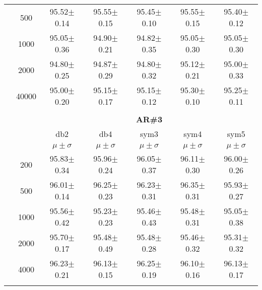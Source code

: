 \begin{table}[H]
\begin{tabular}{|c|c|c c c c c|}
&500  & 95.52$\pm$0.14	& 95.55$\pm$0.15	& 95.45$\pm$0.10	& 95.55$\pm$0.15	&95.40$\pm$0.12 \\\cline{2-7}
           
&1000 &95.05$\pm$0.36	&94.90$\pm$0.21	&94.82$\pm$0.35	&95.05$\pm$0.30	&95.05$\pm$0.30 \\\cline{2-7}
           
&2000 &94.80$\pm$0.25&94.87$\pm$0.29	&94.80$\pm$0.32	&95.12$\pm$0.21	&95.00$\pm$0.33\\\cline{2-7}
          
&40000&95.00$\pm$0.20	&95.15$\pm$0.17	&95.15$\pm$0.12	&95.30$\pm$0.10	&95.25$\pm$0.11  \\ \midrule
\multicolumn{7}{c}{}\\ 



\cline{3-7}
\multicolumn{2}{c|}{\multirow{3}{*}{}} & \multicolumn{5}{c|}{\textbf{AR\#3}}   \\\cline{3-7} 
\multicolumn{2}{c|}{}  & db2 & db4 & sym3 & sym4 & sym5 \\\cline{3-7}%
\multicolumn{2}{c|}{}& $\mu \pm \sigma$ & $\mu \pm \sigma$ & $\mu \pm \sigma$ & $\mu \pm \sigma$ & $\mu \pm \sigma$ \\\hline

\multicolumn{1}{|c|}{ \multirow{5}{*}{\rotatebox[origin=c]{90}{\textbf{Neurônios}}} }
& 200	&95.83$\pm$0.34		&95.96$\pm$0.24		&96.05$\pm$0.37		&96.11$\pm$0.30		&96.00$\pm$0.26  \\\cline{2-7}

& 500	&96.01$\pm$0.14		& 96.25$\pm$0.23	&96.23$\pm$0.31		& 96.35$\pm$0.31	&95.93$\pm$0.27 \\\cline{2-7}

& 1000	&95.56$\pm$0.42		&95.23$\pm$0.23		&95.46$\pm$0.43		&95.48$\pm$0.31		&95.05$\pm$0.38  \\\cline{2-7}

& 2000	&95.70$\pm$0.17		&95.48$\pm$0.49		&95.48$\pm$0.28		&95.46$\pm$0.32		&95.31$\pm$0.32 \\\cline{2-7}

& 4000	& 96.23$\pm$0.21	&96.13$\pm$0.15		& 96.25$\pm$0.19	&96.10$\pm$0.16		& 96.13$\pm$0.17 \\\midrule

\multicolumn{7}{c}{}\\ 




\end{tabular}
\end{table}
